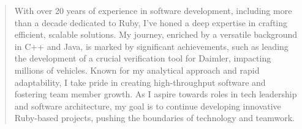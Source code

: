 \begin{minipage}{\linewidth}
\begin{quote}
With over 20 years of experience in software development, including more than a decade dedicated to Ruby, I've honed a deep expertise in crafting efficient, scalable solutions. 
My journey, enriched by a versatile background in C++ and Java, is marked by significant achievements, such as leading the development of a crucial verification tool for Daimler, impacting millions of vehicles. 
Known for my analytical approach and rapid adaptability, I take pride in creating high-throughput software and fostering team member growth. 
As I aspire towards roles in tech leadership and software architecture, my goal is to continue developing innovative Ruby-based projects, pushing the boundaries of technology and teamwork.   
\end{quote}
\end{minipage}
